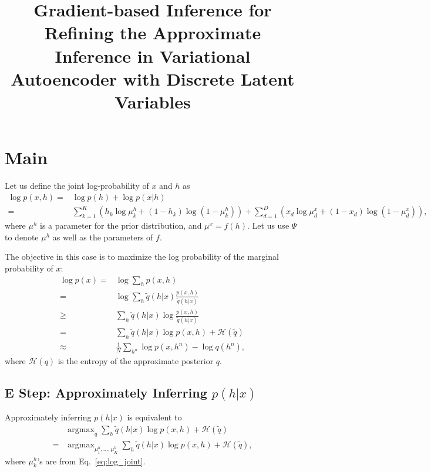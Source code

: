 \documentclass{article}
\newcommand{\HH}[0]{\mathcal{H}}
\DeclareMathOperator*{\argmax}{\arg \max}
\begin{document}
\title{Gradient-based Inference for Refining the Approximate Inference in
Variational Autoencoder with Discrete Latent Variables}
\author{}

\maketitle
{}

\section{Main}

Let us define the joint log-probability of $x$ and $h$ as
\begin{align}
    \label{eq:log_joint}
    \log p(x, h) =& \log p(h) + \log p(x|h) \\
    =& 
    \sum_{k=1}^K (h_k \log \mu^h_k + (1 - h_k) \log (1 - \mu^h_k))
    + \sum_{d=1}^D (x_d \log \mu^x_d + (1 - x_d) \log (1 - \mu^x_d)),
\end{align}
where $\mu^h$ is a parameter for the prior distribution, and $\mu^x = f(h)$. Let
us use $\Psi$ to denote $\mu^h$ as well as the parameters of $f$.

The objective in this case is to maximize the log probability of the marginal
probability of $x$:
\begin{align}
    \label{eq:approx_logp}
    \log p(x) =& \log \sum_{h} p(x, h) \nonumber \\
    =& \log \sum_h \tilde{q}(h|x) \frac{p(x, h)}{\tilde{q}(h|x)} \nonumber \\
    \geq& \sum_h \tilde{q}(h|x) \log \frac{p(x, h)}{\tilde{q}(h|x)} \nonumber \\
    =& \sum_h \tilde{q}(h|x) \log p(x,h) + \HH(\tilde{q}) \nonumber \\
    \approx& \frac{1}{N} \sum_{h^n} \log p(x, h^n) - \log
    q(h^n),
\end{align}
where $\HH(q)$ is the entropy of the approximate posterior $q$.

\subsection{E Step: Approximately Inferring $p(h|x)$}

Approximately inferring $p(h|x)$ is equivalent to 
\begin{align*}
    &\argmax_{q}  \sum_h \tilde{q}(h|x) \log p(x,h) + \HH(\tilde{q}) \\
    =& \argmax_{\mu^h_1, \ldots, \mu^h_K} \sum_h \tilde{q}(h|x) \log p(x,h) + \HH(\tilde{q}),
\end{align*}
where $\mu^h_k$'s are from Eq.~\eqref{eq:log_joint}.
\end{document}
